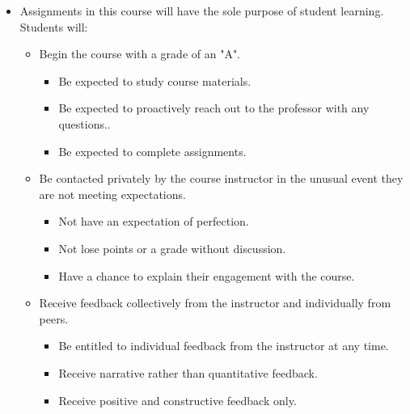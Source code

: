 \documentclass[11pt]{article}
\begin{document}
\begin{itemize}
    \item Assignments in this course will have the sole purpose of student learning. Students will:
        \begin{itemize}
            \item  Begin the course with a grade of an "A".
            \begin{itemize}
                \item  Be expected to study course materials.
                \item  Be expected to proactively reach out to the professor with any questions..
                \item  Be expected to complete assignments.
            \end{itemize}
            \item  Be contacted privately by the course instructor in the unusual event they are not meeting expectations.
            \begin{itemize}
                \item  Not have an expectation of perfection.
                \item  Not lose points or a grade without discussion.
                \item  Have a chance to explain their engagement with the course.
            \end{itemize}
            \item  Receive feedback collectively from the instructor and individually from peers.
            \begin{itemize}
                \item  Be entitled to individual feedback from the instructor at any time.
                \item  Receive narrative rather than quantitative feedback.
                \item  Receive positive and constructive feedback only.
            \end{itemize}
        \end{itemize}
\end{itemize}


\end{document}
